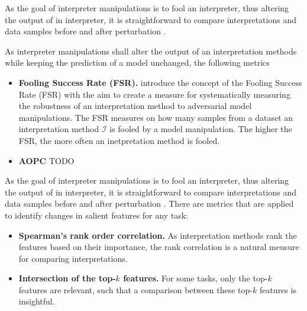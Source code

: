 As the goal of interpreter manipulations is to fool an interpreter, thus altering the output of in interpreter, it is straightforward to compare interpretations and data samples before and after perturbation \cite{ghorbani2019interpretation}.

As interpreter manipulations shall alter the output of an interpretation methods while keeping the prediction of a model unchanged, the following metrics 

\begin{itemize}
    \item \textbf{Fooling Success Rate (FSR).} \cite{fooling_nn_interpreters} introduce the concept of the Fooling Success Rate (FSR) with the aim to create a measure for systematically measuring the robustness of an interpretation method to adversarial model manipulations. The FSR measures on how many samples from a dataset an interpretation method $\mathcal{I}$ is fooled by a model manipulation. The higher the FSR, the more often an inetpretation method is fooled. 
    \item \textbf{AOPC} TODO
\end{itemize}

As the goal of interpreter manipulations is to fool an interpreter, thus altering the output of in interpreter, it is straightforward to compare interpretations and data samples before and after perturbation \cite{ghorbani2019interpretation}.
There are metrics that are applied to identify changes in salient features for any task:
\begin{itemize}
    \item \textbf{Spearman's rank order correlation.} As interpretation methods rank the features based on their importance, the rank correlation \cite{spearman1961proof} is a natural meusure for comparing interpretations. 
    \item \textbf{Intersection of the top-$k$ features.} For some tasks, only the top-$k$ features are relevant, such that a comparison between these top-$k$ features is insightful. 
\end{itemize}

